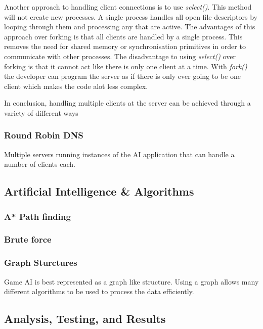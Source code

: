 \documentclass[12pt,a4paper,titlepage]{article}
\begin{document}
Another approach to handling client connections is to use \textit{select()}. This method will not create new processes. A single process handles all open file descriptors by looping through them and processing any that are active. The advantages of this approach over forking is that all clients are handled by a single process. This removes the need for shared memory or synchronisation primitives in order to communicate with other processes.\cite{theworldofselect} The disadvantage to using \textit{select()} over forking is that it cannot act like there is only one client at a time. With \textit{fork()} the developer can program the server as if there is only ever going to be one client which makes the code alot less complex. 



In conclusion, handling multiple clients at the server can be achieved through a variety of different ways 

\subsubsection{Round Robin DNS}

Multiple servers running instances of the AI application that can handle a number of clients each. 

\subsection{Artificial Intelligence \& Algorithms}
\label{section:aimoduledesign}

\subsubsection{A* Path finding}

\subsubsection{Brute force}

\subsubsection{Graph Sturctures}

Game AI is best represented as a graph like structure. Using a graph allows many different algorithms to be used to process the data efficiently.

\subsection{Analysis, Testing, and Results}
\end{document}
